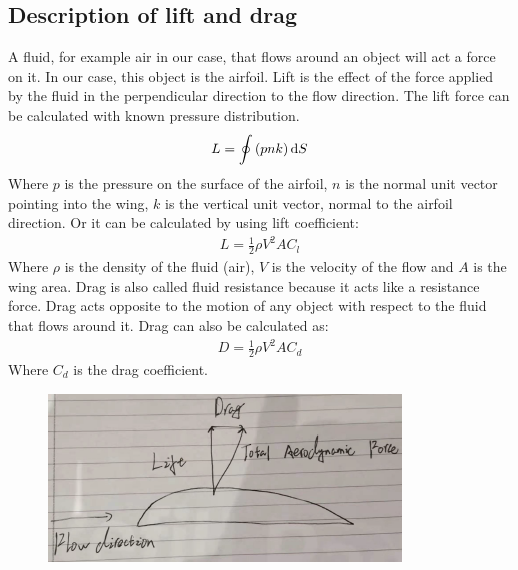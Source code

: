 \documentclass[11pt]{article}
\begin{document}
\subsection*{Description of lift and drag}
A fluid, for example air in our case, that flows around an object will act a force on it. In our case, this object is the airfoil. Lift is the effect of the force applied by the fluid in the perpendicular direction to the flow direction. The lift force can be calculated with known pressure distribution.
\begin{align}
  L = \oint \left(p n k \right)\dif S
\end{align}
Where $p$ is the pressure on the surface of the airfoil, $n$ is the normal unit vector pointing into the wing, $k$ is the vertical unit vector, normal to the airfoil direction. Or it can be calculated by using lift coefficient:
\begin{align}
  L = \frac{1}{2} \rho V^2 A C_l
\end{align}
Where $\rho$ is the density of the fluid (air), $V$ is the velocity of the flow and $A$ is the wing area. Drag is also called fluid resistance because it acts like a resistance force. Drag acts opposite to the motion of any object with respect to the fluid that flows around it. Drag can also be calculated as:
\begin{align}
  D = \frac{1}{2} \rho V^2 A C_d 
\end{align}
Where $C_d$ is the drag coefficient.
\begin{figure}[H]
  \centering
  \includegraphics[width = 0.5 \textwidth]{./img/diagram1.png}
  \caption{}
\end{figure}
\end{document}
